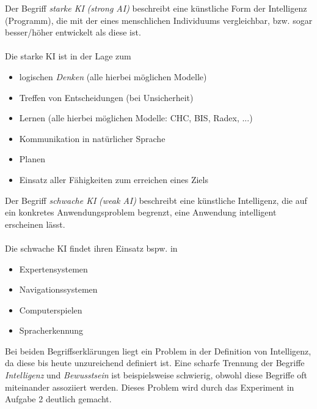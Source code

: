 \documentclass{article}
\begin{document}
Der Begriff \textit{starke KI} \textit{(strong AI)} beschreibt eine künstliche Form der Intelligenz (Programm), die mit der eines menschlichen Individuums vergleichbar, bzw. sogar besser/höher entwickelt als diese ist.\\
\\
Die starke KI ist in der Lage zum
\begin{itemize}
\item logischen \textit{Denken} (alle hierbei möglichen Modelle)
\item Treffen von Entscheidungen (bei Unsicherheit)
\item Lernen (alle hierbei möglichen Modelle: CHC, BIS, Radex, ...)
\item Kommunikation in natürlicher Sprache
\item Planen
\item Einsatz aller Fähigkeiten zum erreichen eines Ziels
\end{itemize}
Der Begriff \textit{schwache KI} \textit{(weak AI)} beschreibt eine künstliche Intelligenz, die auf ein konkretes Anwendungsproblem begrenzt, eine Anwendung intelligent erscheinen lässt.\\
\\
Die schwache KI findet ihren Einsatz bspw. in
\begin{itemize}
\item Expertensystemen
\item Navigationssystemen
\item Computerspielen
\item Spracherkennung
\end{itemize}
Bei beiden Begriffserklärungen liegt ein Problem in der Definition von Intelligenz, da diese bis heute unzureichend definiert ist. Eine scharfe Trennung der Begriffe \textit{Intelligenz} und \textit{Bewusstsein} ist beispielsweise schwierig, obwohl diese Begriffe oft miteinander assoziiert werden. Dieses Problem wird durch das Experiment in Aufgabe 2 deutlich gemacht.
\end{document}
